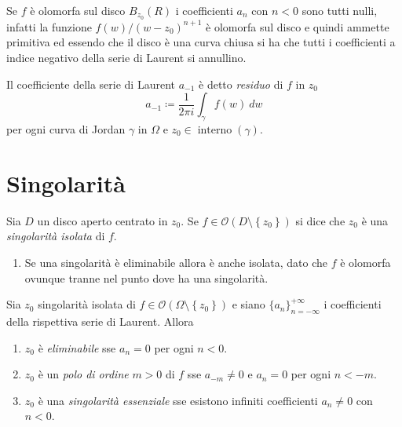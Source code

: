 \begin{remark}
  Se $f$ è olomorfa sul disco $B_{z_0}(R)$ i coefficienti $a_n$ con $n < 0$ sono
  tutti nulli, infatti la funzione $f(w) / (w-z_0)^{n+1}$ è olomorfa sul disco
  e quindi ammette primitiva ed essendo che il disco è una curva chiusa si ha
  che tutti i coefficienti a indice negativo della serie di Laurent si
  annullino.
  \label{rmk:coefficienti_negativi}
\end{remark}

\begin{definition}
  Il coefficiente della serie di Laurent $a_{-1}$ è detto \emph{residuo} di $f$
  in $z_0$ 
  \begin{equation*}
    a_{-1} \coloneqq \frac{1}{2\pi i} \int_{\gamma} f(w)\ dw
  \end{equation*}
  per ogni curva di Jordan $\gamma$ in $\Omega$ e $z_0 \in
  \operatorname{interno}(\gamma)$.
  \label{def:residuo}
\end{definition}

\section{Singolarità}

\begin{definition}
  Sia $D$ un disco aperto centrato in $z_0$. Se $f \in \mathcal{O}(D \setminus
  \left\{ z_0 \right\})$ si dice che $z_0$ è una \emph{singolarità isolata} di
  $f$.
  \label{def:singolarità_isolata}
\end{definition}

\begin{example}
  \begin{enumerate}
    \item Se una singolarità è eliminabile allora è anche isolata, dato che $f$
      è olomorfa ovunque tranne nel punto dove ha una singolarità.
  \end{enumerate}
\end{example}

\begin{definition}
  Sia $z_0$ singolarità isolata di $f \in \mathcal{O}(\Omega \setminus \left\{
  z_0 \right\})$ e siano $\{a_n\}_{n=-\infty}^{+\infty}$ i coefficienti della
  rispettiva serie di Laurent. Allora
  \begin{enumerate}
    \item $z_0$ è \emph{eliminabile} sse $a_n = 0$ per ogni $n < 0$.
    \item $z_0$ è un \emph{polo di ordine} $m > 0$ di $f$ sse $a_{-m} \neq 0$ e $a_n
      = 0$ per ogni $n < -m$.
    \item $z_0$ è una \emph{singolarità essenziale} sse esistono infiniti coefficienti
      $a_n \neq 0$ con $n < 0$.
  \end{enumerate}
  \label{def:classificazione_singolarita_per_serie_di_laurent}
\end{definition}

